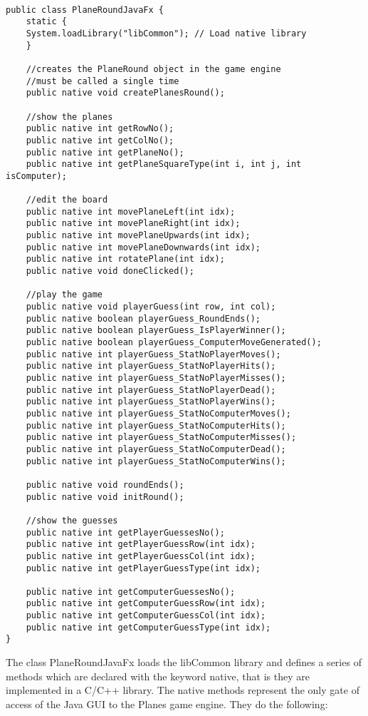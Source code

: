 \begin{lstlisting} 

public class PlaneRoundJavaFx {
	static {
	System.loadLibrary("libCommon"); // Load native library 
	}
	
	//creates the PlaneRound object in the game engine
	//must be called a single time	
	public native void createPlanesRound(); 
	
	//show the planes
	public native int getRowNo();
	public native int getColNo();
	public native int getPlaneNo();
	public native int getPlaneSquareType(int i, int j, int isComputer);
	
	//edit the board
	public native int movePlaneLeft(int idx);
	public native int movePlaneRight(int idx);
	public native int movePlaneUpwards(int idx);
	public native int movePlaneDownwards(int idx);
	public native int rotatePlane(int idx);
	public native void doneClicked();
	
	//play the game
	public native void playerGuess(int row, int col);
	public native boolean playerGuess_RoundEnds();
	public native boolean playerGuess_IsPlayerWinner();
	public native boolean playerGuess_ComputerMoveGenerated();
	public native int playerGuess_StatNoPlayerMoves();
	public native int playerGuess_StatNoPlayerHits();
	public native int playerGuess_StatNoPlayerMisses();
	public native int playerGuess_StatNoPlayerDead();
	public native int playerGuess_StatNoPlayerWins();
	public native int playerGuess_StatNoComputerMoves();
	public native int playerGuess_StatNoComputerHits();
	public native int playerGuess_StatNoComputerMisses();
	public native int playerGuess_StatNoComputerDead();
	public native int playerGuess_StatNoComputerWins();
	
	public native void roundEnds();
	public native void initRound();
	
	//show the guesses
	public native int getPlayerGuessesNo();
	public native int getPlayerGuessRow(int idx);
	public native int getPlayerGuessCol(int idx);
	public native int getPlayerGuessType(int idx);
	
	public native int getComputerGuessesNo();
	public native int getComputerGuessRow(int idx);
	public native int getComputerGuessCol(int idx);
	public native int getComputerGuessType(int idx);	
}

\end{lstlisting}

The class PlaneRoundJavaFx loads the libCommon library and defines a series of methods which are declared with the keyword native, that is they are implemented in a C/C++ library. The native methods represent the only gate of access of the Java GUI to the Planes game engine. They do the following:

